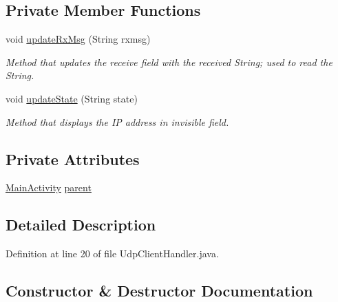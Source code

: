 \subsection*{Private Member Functions}
\begin{DoxyCompactItemize}
\item 
void \mbox{\hyperlink{classcom_1_1example_1_1trainawearapplication_1_1_udp_client_handler_a8fa21c06cef3adafc938dc19ecc232ab}{update\+Rx\+Msg}} (String rxmsg)
\begin{DoxyCompactList}\small\item\em Method that updates the receive field with the received String; used to read the String. \end{DoxyCompactList}\item 
void \mbox{\hyperlink{classcom_1_1example_1_1trainawearapplication_1_1_udp_client_handler_a65fd50027c6302d5c8d858e844fc3e6f}{update\+State}} (String state)
\begin{DoxyCompactList}\small\item\em Method that displays the IP address in invisible field. \end{DoxyCompactList}\end{DoxyCompactItemize}
\subsection*{Private Attributes}
\begin{DoxyCompactItemize}
\item 
\mbox{\hyperlink{classcom_1_1example_1_1trainawearapplication_1_1_main_activity}{Main\+Activity}} \mbox{\hyperlink{classcom_1_1example_1_1trainawearapplication_1_1_udp_client_handler_a93942bc64a7d7d570d27c9e485d361e4}{parent}}
\end{DoxyCompactItemize}


\subsection{Detailed Description}


Definition at line 20 of file Udp\+Client\+Handler.\+java.



\subsection{Constructor \& Destructor Documentation}
\mbox{\label{classcom_1_1example_1_1trainawearapplication_1_1_udp_client_handler_ab5ff425dbf594d074ab709f2be441419}} 
